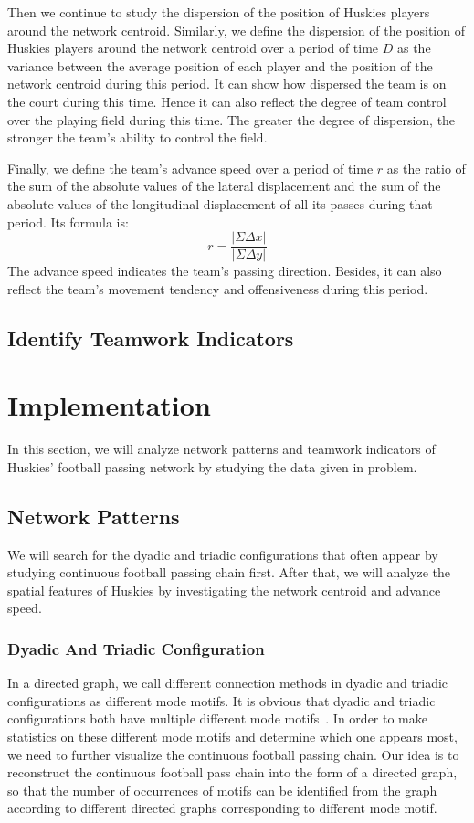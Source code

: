 \documentclass{mcmthesis}
\begin{document}
	Then we continue to study the dispersion of the position of Huskies players around the network centroid.  Similarly, we define the dispersion of the position of Huskies players around the network centroid over a period of time $D$ as the variance between the average position of each player and the position of the network centroid during this period.  It can show how dispersed the team is on the court during this time.  Hence it can also reflect the degree of team control over the playing field during this time.  The greater the degree of dispersion, the stronger the team's ability to control the field.

	Finally, we define the team's advance speed over a period of time $r$ as the ratio of the sum of the absolute values ​​of the lateral displacement and the sum of the absolute values ​​of the longitudinal displacement of all its passes during that period. Its formula is:
	$$r=\frac{|\Sigma \Delta x|}{|\Sigma \Delta y|}$$
	The advance speed indicates the team's passing direction.  Besides, it can also reflect the team's movement tendency and offensiveness during this period.
\subsection{Identify Teamwork Indicators}
\section{Implementation}
	In this section, we will analyze network patterns and teamwork indicators of Huskies' football passing network by studying the data given in problem. 
\subsection{Network Patterns}
	We will search for the dyadic and triadic configurations that often appear by studying continuous football passing chain first.  After that, we will analyze the spatial features of Huskies by investigating the network centroid and advance speed.
\subsubsection{Dyadic And Triadic Configuration}
	In a directed graph, we call different connection methods in dyadic and triadic configurations as different mode motifs.  It is obvious that dyadic and triadic configurations both have multiple different mode motifs~\cite{Second}.  In order to make statistics on these different mode motifs and determine which one appears most, we need to further visualize the continuous football passing chain.  Our idea is to reconstruct the continuous football pass chain into the form of a directed graph, so that the number of occurrences of motifs can be identified from the graph according to different directed graphs corresponding to different mode motif.
\end{document}
